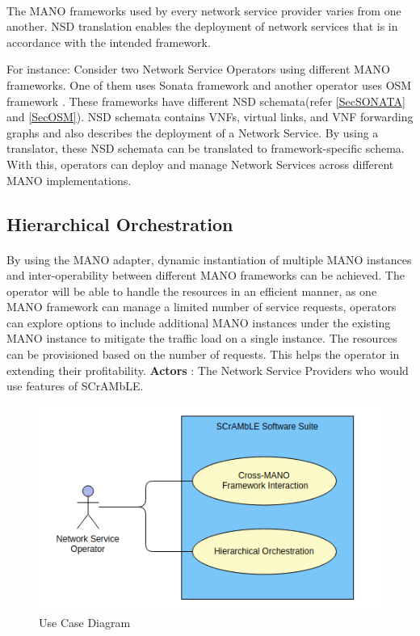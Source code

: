 \paragraph{}

The MANO frameworks used by every network service provider varies from one another. NSD translation enables the deployment of network services that is in accordance with the intended framework.

For instance: Consider two Network Service Operators using different MANO frameworks. One of them uses Sonata framework \cite{draxler2017sonata} and another operator uses OSM framework \cite{ersue2013etsi}. These frameworks have different NSD schemata(refer \ref{SecSONATA} and \ref{SecOSM}). NSD schemata contains VNFs, virtual links, and VNF forwarding graphs and also describes the deployment of a Network Service. By using a translator, these NSD schemata can be translated to framework-specific schema. With this, operators can deploy and manage Network Services across different MANO implementations.

\subsection{Hierarchical Orchestration}
\paragraph{}
By using the MANO adapter, dynamic instantiation of multiple MANO instances and inter-operability between different MANO frameworks can be achieved. The operator will be able to handle the resources in an efficient manner, as one MANO framework can manage a limited number of service requests, operators can explore options to include additional MANO instances under the existing MANO instance to mitigate the traffic load on a single instance. The resources can be provisioned based on the number of requests. This helps the operator in extending their profitability.
\newpage
\textbf{Actors} : The Network Service Providers who would use features of SCrAMbLE.

\begin{figure} [h]
	\centering
	\includegraphics[width=1.0\linewidth]{figures/use-case}
	\caption{Use Case Diagram}
	\label{fig:use-case}
\end{figure}





